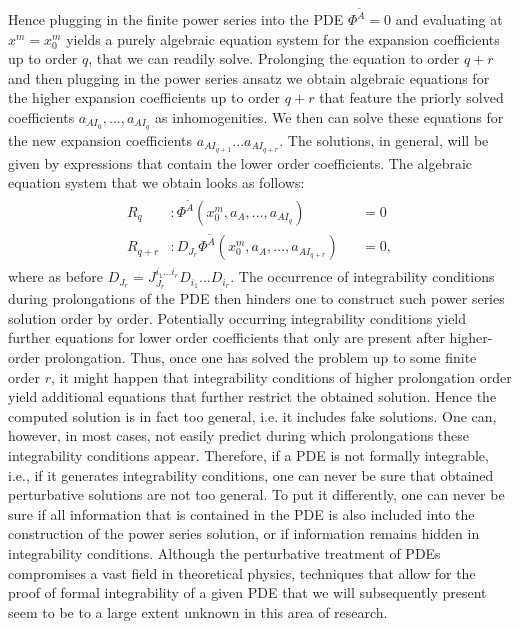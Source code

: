 Hence plugging in the finite power series into the PDE $\Phi^{\tilde{A}} =0$ and evaluating at $x^m=x^m_0$ yields a purely algebraic equation system for the expansion coefficients up to order $q$, that we can readily solve. Prolonging the equation to order $q+r$ and then plugging in the power series ansatz we obtain algebraic equations for the higher expansion coefficients up to order $q+r$ that feature the priorly solved coefficients $a_{AI_0},...,a_{AI_q}$ as inhomogenities. We then can solve these equations for the new expansion coefficients $a_{AI_{q+1}}...a_{AI_{q+r}}$. The solutions, in general, will be given by expressions that contain the lower order coefficients.
The algebraic equation system that we obtain looks as follows:
\begin{align}
\begin{aligned}
R_q &: \Phi^{\tilde{A}}(x_0^m,a_A,...,a_{AI_q}) &&= 0 \\
R_{q+r} &:  D_{J_r}\Phi^{\tilde{A}}(x_0^m,a_A,...,a_{AI_{q+r}}) &&= 0,
\end{aligned}
\end{align}
where as before $D_{J_r} = J^{i_1...i_r}_{J_r} D_{i_1} ... D_{i_r}$.
The occurrence of integrability conditions during prolongations of the PDE then hinders one to construct such power series solution order by order. Potentially occurring integrability conditions yield further equations for lower order coefficients that only are present after higher-order prolongation. Thus, once one has solved the problem up to some finite order $r$, it might happen that integrability conditions of higher prolongation order yield additional equations that further restrict the obtained solution. 
Hence the computed solution is in fact too general, i.e. it includes fake solutions.
One can, however, in most cases, not easily predict during which prolongations these integrability conditions appear. Therefore, if a PDE is not formally integrable, i.e., if it generates integrability conditions, one can never be sure that obtained perturbative solutions are not too general. To put it differently, one can never be sure if all information that is contained in the PDE is also included into the construction of the power series solution, or if information remains hidden in integrability conditions.
Although the perturbative treatment of PDEs compromises a vast field in theoretical physics, techniques that allow for the proof of formal integrability of a given PDE that we will subsequently present seem to be to a large extent unknown in this area of research. 

